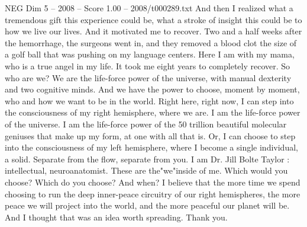 \begin{textsample}{NEG Dim 5 – 2008 – Score 1.00 – 2008/t000289.txt}
And then I realized what a tremendous gift this experience could be, what a stroke of insight this could be to how we live our lives.
And it motivated me to recover.
Two and a half weeks after the hemorrhage, the surgeons went in, and they removed a blood clot the size of a golf ball that was pushing on my language centers.
Here I am with my mama, who is a true angel in my life.
It took me eight years to completely recover.
So who are we?
We are the life-force power of the universe, with manual dexterity and two cognitive minds.
And we have the power to choose, moment by moment, who and how we want to be in the world.
Right here, right now, I can step into the consciousness of my right hemisphere, where we are.
I am the life-force power of the universe.
I am the life-force power of the 50 trillion beautiful molecular geniuses that make up my form, at one with all that is.
Or, I can choose to step into the consciousness of my left hemisphere, where I become a single individual, a solid.
Separate from the flow, separate from you.
I am Dr.
Jill Bolte Taylor : intellectual, neuroanatomist.
These are the"we"inside of me.
Which would you choose?
Which do you choose?
And when?
I believe that the more time we spend choosing to run the deep inner-peace circuitry of our right hemispheres, the more peace we will project into the world, and the more peaceful our planet will be.
And I thought that was an idea worth spreading.
Thank you.

\end{textsample}
